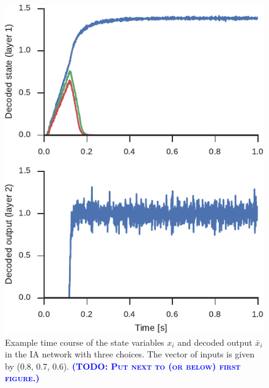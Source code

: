 \documentclass[10pt,letterpaper]{article}
\makeatletter
\newcommand{\todo}[1]{\textbf{\textsc{\textcolor{blue}{(TODO\@: #1)}}}}
\makeatother
\begin{document}
\begin{figure}
    \centering
    \includegraphics{figures/indacc}
    \caption{ \label{fig:indacc}
        Example time course of the state variables $x_i$ and decoded output $\bar{x}_i$ in the IA network with three choices.
        The vector of inputs is given by (0.8, 0.7, 0.6).
        \todo{Put next to (or below) first figure.}
    }
\end{figure}
\end{document}
